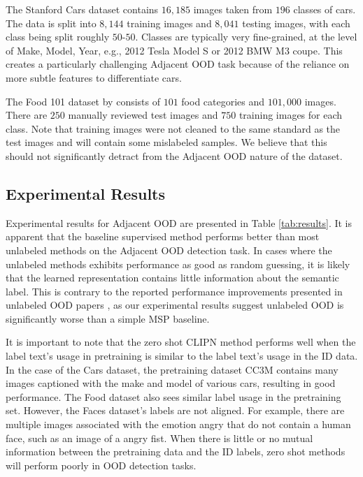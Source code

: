 \documentclass[11pt, oneside]{book}
\theoremstyle{plain}
\theoremstyle{definition}
\theoremstyle{remark}
\begin{document}
The Stanford Cars dataset \citep{KrauseStarkDengFei-Fei_3DRR2013} contains $16,185$ images taken from $196$ classes of cars. The data is split into $8,144$ training images and $8,041$ testing images, with each class being split roughly $50$-$50$. Classes are typically very fine-grained, at the level of Make, Model, Year, e.g., 2012 Tesla Model S or 2012 BMW M3 coupe. This creates a particularly challenging Adjacent OOD task because of the reliance on more subtle features to differentiate cars.

The Food 101 dataset by \citet{bossard14} consists of $101$ food categories and $101,000$ images. There are $250$ manually reviewed test images and $750$ training images for each class. Note that training images were not cleaned to the same standard as the test images and will contain some mislabeled samples. We believe that this should not significantly detract from the Adjacent OOD nature of the dataset.

\subsection{Experimental Results}

Experimental results for Adjacent OOD are presented in Table \ref{tab:results}. It is apparent that the baseline supervised method performs better than most unlabeled methods on the Adjacent OOD detection task. In cases where the unlabeled methods exhibits performance as good as random guessing, it is likely that the learned representation contains little information about the semantic label. This is contrary to the reported performance improvements presented in unlabeled OOD papers \citep{sehwag2021ssd, hendrycks2019using, liu2023unsupervised}, as our experimental results suggest unlabeled OOD is significantly worse than a simple MSP baseline.

It is important to note that the zero shot CLIPN method performs well when the label text's usage in pretraining is similar to the label text's usage in the ID data. In the case of the Cars dataset, the pretraining dataset CC3M \citep{sharma2018conceptual} contains many images captioned with the make and model of various cars, resulting in good performance. The Food dataset also sees similar label usage in the pretraining set. However, the Faces dataset's labels are not aligned. For example, there are multiple images associated with the emotion angry that do not contain a human face, such as an image of a angry fist. When there is little or no mutual information between the pretraining data and the ID labels, zero shot methods will perform poorly in OOD detection tasks.
\end{document}
